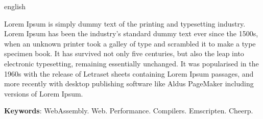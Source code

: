 \begin{resumo}[Abstract]
	\SingleSpacing
	\begin{otherlanguage*}{english}


Lorem Ipsum is simply dummy text of the printing and typesetting industry. Lorem Ipsum has been the industry's standard dummy text ever since the 1500s, when an unknown printer took a galley of type and scrambled it to make a type specimen book. It has survived not only five centuries, but also the leap into electronic typesetting, remaining essentially unchanged. It was popularised in the 1960s with the release of Letraset sheets containing Lorem Ipsum passages, and more recently with desktop publishing software like Aldus PageMaker including versions of Lorem Ipsum.

		
		\textbf{Keywords}: WebAssembly. Web. Performance. Compilers. Emscripten. Cheerp.
	\end{otherlanguage*}
\end{resumo}

% 
%
%  

{%
	\hypersetup{hidelinks}
	\listoffigures*
	\cleardoublepage
	
	\listofquadros*
	\cleardoublepage
	
	\listoftables*
	\cleardoublepage
	
	\imprimirlistadesiglas
	
	\imprimirlistadesimbolos
	
	\tableofcontents*
	\cleardoublepage
	
}%
